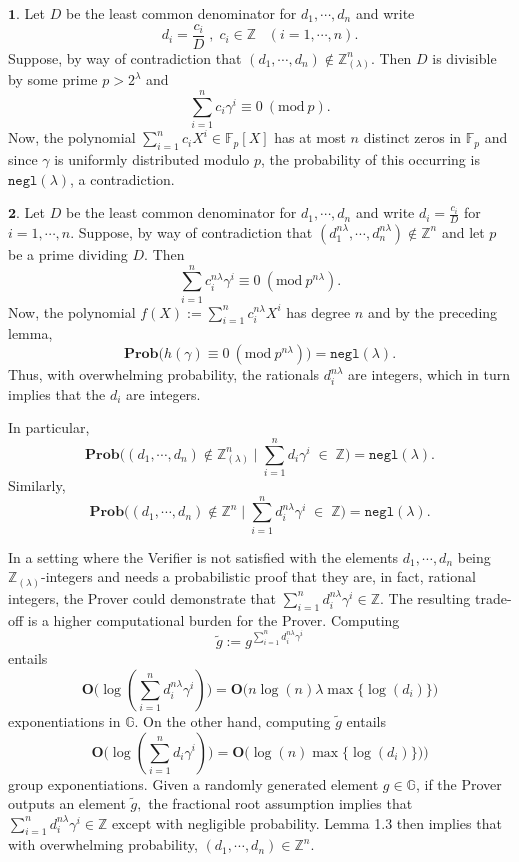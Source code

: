 \documentclass[11pt, lettersize, notitlepage, leqno, footskip=0.6cm]{article}
\newcommand{\bz}{\mathbb Z}
\newcommand{\bFp}{\mathbb{F}_p}
\newcommand{\slim}{\sum\limits}
\newcommand{\ttt}{\texttt}
\newcommand{\negl}{\ttt{{negl}}}
\newcommand{\wti}{\widetilde}
\newcommand{\mb}{\mathbb}
\newcommand{\mbf}{\mathbf}
\newcommand{\lam}{\lambda}
\newcommand{\lamb}{\lambda}
\newcommand{\bzlam}{\bz_{(\lam)}}
\newcommand{\Prob}{\mbf{Prob}}
\newcommand{\vs}{\vspace{-0.15cm}}
\newcommand{\noin}{\noindent}
\newcommand{\op}{overwhelming probability}
\newcommand{\Mod}[1]{\ (\mathrm{mod}\ #1)}
\numberwithin{equation}{section}
\begin{document}
\begin{prf} $\mbf{1}$. Let $D$ be the least common denominator for $d_1,\cdots, d_n$ and write \vs $$d_i = \frac{c_i}{D}\;,\; c_i\in\bz\; \;\;(i=1,\cdots, n).$$ Suppose, by way of contradiction that $(d_1,\cdots, d_n )\notin \bzlam^n$. Then $D$ is divisible by some prime $p>2^{\lam}$ and \vs $$\sum\limits_{i=1}^n  {c_i\gamma^i} \equiv 0\Mod{p}.$$ Now, the polynomial $\sum\limits_{i=1}^n c_iX^i \in \bFp[X]$ has at most $n$ distinct zeros in $\bFp$ and since $\gamma$ is uniformly distributed modulo $p$, the probability of this occurring is $\negl(\lamb)$, a contradiction.\vspace{0.15cm} 

\noin $\mbf{2}$. Let $D$ be the least common denominator for $d_1,\cdots, d_n$ and write $d_i = \frac{c_i}{D}$ for $i=1,\cdots, n.$ Suppose, by way of contradiction that $(d_1^{n\lam},\cdots, d_n^{n\lam} )\notin \bz^n$ and let $p$ be a prime dividing $D$. Then $$\slim_{i=1}^n c_i^{n\lam}\gamma^i \equiv 0\Mod{p^{n\lam}}.$$ Now, the polynomial $f(X):= \slim_{i=1}^n c_i^{n\lam} X^i$ has degree $n$ and by the preceding lemma, \vs $$\mbf{Prob}\big(h(\gamma)\equiv 0\Mod{p^{n\lam}} \big) = \negl(\lam).$$ Thus, with \op, the rationals $d_i^{n\lam}$ are integers, which in turn implies that the $d_i$ are integers.\end{prf}


\begin{comment}
For the second part, note that \vs $$\Prob\big(\sum\limits_{i=1}^n d_i\gamma_j^i\in \bz\;\forall j\big|\; (d_1,\cdots,d_n)\notin \bz\big ) = \Prob\big(\sum\limits_{i=1}^n d_i\gamma^i\in \bz\big|\; (d_1,\cdots,d_n)\notin \bz\big )^{\lam} = \negl(\lam).$$\end{comment}

\noindent In particular, \vs $$\mbf{Prob}\big((d_1,\cdots, d_n)\notin \bzlam^n \;\Big|\;\sum\limits_{i=1}^n d_i\gamma^i\; \in \;\bz \big) = \negl(\lamb).$$ Similarly, \vs $$ \mbf{Prob}\big((d_1,\cdots, d_n)\notin \bz^n \;\Big|\;\sum\limits_{i=1}^n d_i^{n\lam}\gamma^i\; \in \;\bz \big) = \negl(\lamb). $$


In a setting where the Verifier is not satisfied with the elements $d_1,\cdots, d_n$ being $\bzlam$-integers and needs a probabilistic proof that they are, in fact, rational integers, the Prover could demonstrate that $\sum\limits_{i=1}^n d_i^{n\lam}\gamma^i\in \bz$. The resulting trade-off is a higher computational burden for the Prover. Computing \vs $$\wti{g} := g^{\slim_{i=1}^n d_i^{n\lam} \gamma^i}$$ entails \vs $$\mbf{O}\big(\log(\slim_{i=1}^n d_i^{n\lam} \gamma^i)\big) = \mbf{O}\big(n\log(n)\lam\max\{\log(d_i)\}\big) $$\vs exponentiations in $\mb{G}$. On the other hand, computing $\wti{g}$ entails \vs $$\mbf{O}\big(\log(\slim_{i=1}^n d_i\gamma^i)\big) = \mbf{O}\big(\log(n)\max\{\log(d_i)\}) \big)$$ \vs group exponentiations. Given a randomly generated element $g\in \mb{G}$, if the Prover outputs an element $\wti{g} ,$ the fractional root assumption implies that $\sum\limits_{i=1}^n d_i^{n\lam}\gamma^i\in \bz$ except with negligible probability. Lemma 1.3 then implies that with \op, $(d_1,\cdots,d_n)\in \bz^n$.
\end{document}
